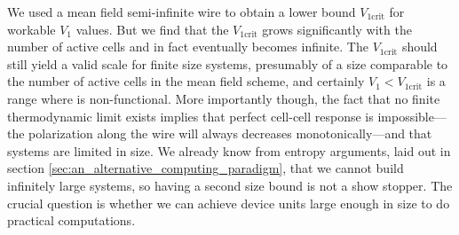 We used a mean field semi-infinite wire to obtain a lower bound
$V_{1\textrm{crit}}$ for workable $V_1$ values. But we find that the
$V_{1\textrm{crit}}$ grows significantly with the number of active cells and in
fact eventually becomes infinite. The $V_{1\textrm{crit}}$ should still yield a
valid scale for finite size  systems, presumably of a size comparable
to the number of active cells in the mean field scheme, and certainly $V_1 <
V_{1\textrm{crit}}$ is a range where  is non-functional. More
importantly though, the fact that no finite thermodynamic limit exists implies
that perfect cell-cell response is impossible---the polarization along the wire
will always decreases monotonically---and that  systems are limited in
size. We already know from entropy arguments, laid out in section
\ref{sec:an_alternative_computing_paradigm}, that we cannot build infinitely
large  systems, so having a second size bound is not a show stopper.
The crucial question is whether we can achieve device units large enough in size
to do practical computations.


